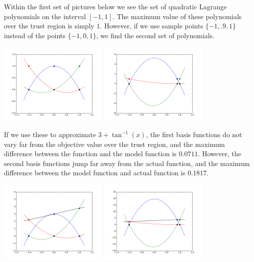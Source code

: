 \documentclass{article}
\begin{document}
Within the first set of pictures below we see the set of quadratic Lagrange polynomials on the interval $[-1,1]$.
The maximum value of these polynomials over the trust region is simply $1$.
However, if we use sample points $\{-1, .9, 1\}$ instead of the points $\{-1, 0, 1\}$,
we find the second set of polynomials.

\includegraphics[width=200px]{poised.png}
\includegraphics[width=200px]{illpoised.png}

If we use these to approximate $3 + \tan^{-1}(x)$, the first basis functions do not vary far from the objective value over the trust region, and the maximum difference between the function and the model function is $0.0711$.
However, the second basis functions jump far away from the actual function, and the maximum difference between the model function and actual function is 
$0.1817$.

\includegraphics[width=200px]{poised_approx.png}
\includegraphics[width=200px]{illpoised_approx.png}
\end{document}

